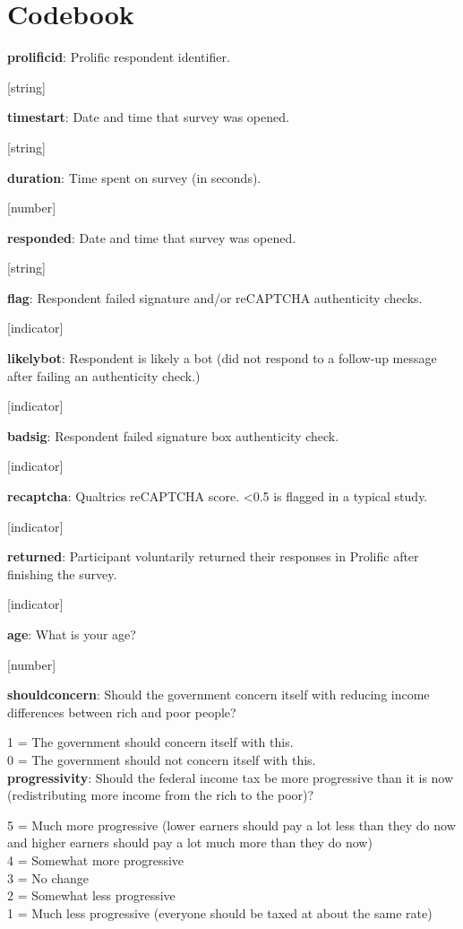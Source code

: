 \documentclass[11pt, headsepline]{article}
\begin{document}
\section*{\centering \LARGE \normalfont Codebook}

\textbf{prolificid}: Prolific respondent identifier.

[string]

\textbf{timestart}: Date and time that survey was opened.

[string]

\textbf{duration}: Time spent on survey (in seconds).

[number]

\textbf{responded}: Date and time that survey was opened.

[string]

\textbf{flag}: Respondent failed signature and/or reCAPTCHA authenticity checks.

[indicator]

\textbf{likelybot}: Respondent is likely a bot (did not respond to a follow-up message after failing an authenticity check.)

[indicator]

\textbf{badsig}: Respondent failed signature box authenticity check.

[indicator]

\textbf{recaptcha}: Qualtrics reCAPTCHA score. <0.5 is flagged in a typical study.

[indicator]

\textbf{returned}: Participant voluntarily returned their responses in Prolific after finishing the survey.

[indicator]

\textbf{age}: What is your age?

[number]

\textbf{shouldconcern}: Should the government concern itself with reducing income differences between rich and poor people?

1 = The government should concern itself with this. \\
0 = The government should not concern itself with this. \\

\textbf{progressivity}: Should the federal income tax be more progressive than it is now (redistributing more income from the rich to the poor)?

5 = Much more progressive (lower earners should pay a lot less than they do now and higher earners should pay a lot much more than they do now) \\
4 = Somewhat more progressive \\
3 = No change \\
2 = Somewhat less progressive \\
1 = Much less progressive (everyone should be taxed at about the same rate)
\end{document}
